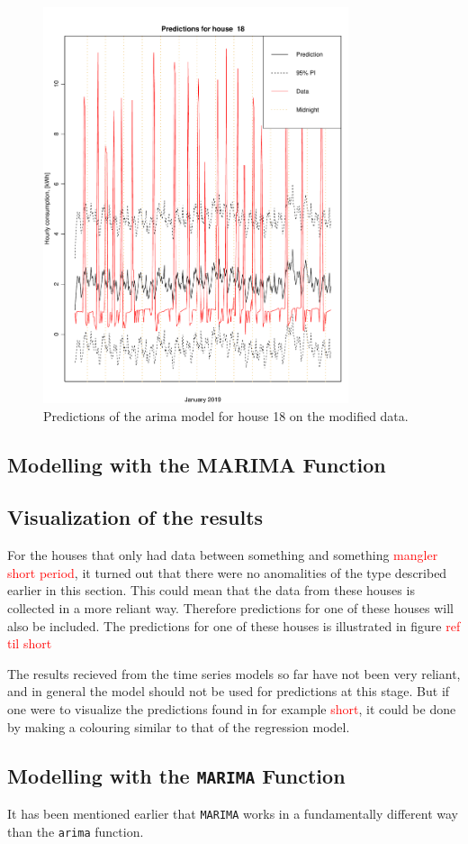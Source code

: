 \begin{figure}
    \centering
    \includegraphics[width=0.8\textwidth]{../../../figures/arimax/arima2_pred_18.pdf}
    \caption{Predictions of the arima model for house 18 on the modified data.}
    \label{fig:arima1_pred_18}
\end{figure}


\subsection{Modelling with the MARIMA Function}

\subsection{Visualization of the results}
For the houses that only had data between something and something \textcolor{red}{mangler short period}, it turned out that there were no anomalities of the type described earlier in this section. This could mean that the data from these houses is collected in a more reliant way. Therefore predictions for one of these houses will also be included. The predictions for one of these houses is illustrated in figure \textcolor{red}{ref til short}


\noindent The results recieved from the time series models so far have not been very reliant, and in general the model should not be used for predictions at this stage. But if one were to visualize the predictions found in for example \textcolor{red}{short}, it could be done by making a colouring similar to that of the regression model.


\subsection{Modelling with the \texttt{MARIMA} Function}
It has been mentioned earlier that \texttt{MARIMA} works in a fundamentally different way than the \texttt{arima} function.